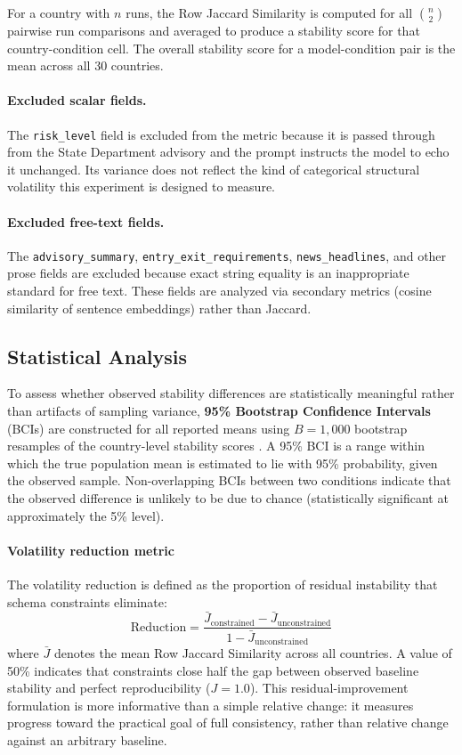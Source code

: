 \documentclass[sigconf]{acmart}
\begin{document}
For a country with $n$ runs, the Row Jaccard Similarity is computed for all $\binom{n}{2}$ pairwise run comparisons and averaged to produce a stability score for that country-condition cell. The overall stability score for a model-condition pair is the mean across all 30 countries.

\paragraph{Excluded scalar fields.} The \texttt{risk\_level} field is excluded from the metric because it is passed through from the State Department advisory and the prompt instructs the model to echo it unchanged. Its variance does not reflect the kind of categorical structural volatility this experiment is designed to measure.

\paragraph{Excluded free-text fields.} The \texttt{advisory\_summary}, \texttt{entry\_exit\_requirements}, \texttt{news\_\allowbreak headlines}, and other prose fields are excluded because exact string equality is an inappropriate standard for free text. These fields are analyzed via secondary metrics (cosine similarity of sentence embeddings) rather than Jaccard.

\subsection{Statistical Analysis}

To assess whether observed stability differences are statistically meaningful rather than artifacts of sampling variance, \textbf{95\% Bootstrap Confidence Intervals} (BCIs) are constructed for all reported means using $B = 1{,}000$ bootstrap resamples of the country-level stability scores \cite{efron1994introduction}. A 95\% BCI is a range within which the true population mean is estimated to lie with 95\% probability, given the observed sample. Non-overlapping BCIs between two conditions indicate that the observed difference is unlikely to be due to chance (statistically significant at approximately the 5\% level).

\paragraph{Volatility reduction metric} The volatility reduction is defined as the proportion of residual instability that schema constraints eliminate:
\[
  \text{Reduction} = \frac{\bar{J}_{\text{constrained}} - \bar{J}_{\text{unconstrained}}}{1 - \bar{J}_{\text{unconstrained}}}
\]
where $\bar{J}$ denotes the mean Row Jaccard Similarity across all countries. A value of 50\% indicates that constraints close half the gap between observed baseline stability and perfect reproducibility ($J{=}1.0$). This residual-improvement formulation is more informative than a simple relative change: it measures progress toward the practical goal of full consistency, rather than relative change against an arbitrary baseline.
\end{document}
